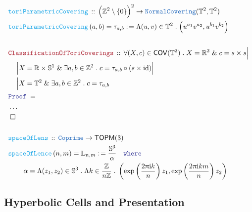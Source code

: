 \documentclass[12pt]{scrartcl}
\newcommand{\TYPE}[1]{\textcolor{NavyBlue}{\mathtt{#1}}}
\newcommand{\FUNC}[1]{\textcolor{Cerulean}{\mathtt{#1}}}
\newcommand{\LOGIC}[1]{\textcolor{Blue}{\mathtt{#1}}}
\newcommand{\THM}[1]{\textcolor{Maroon}{\mathtt{#1}}}
\renewcommand{\.}{\; . \;}
\newcommand{\de}{: \kern 0.1pc =}
\newcommand{\where}{\LOGIC{where}}
\newcommand{\Act}[1]{\left( #1 \right)}
\newcommand{\Theorem}[2]{& \THM{#1} \, :: \, #2 \\ & \Proof = \\ }
\newcommand{\DeclareFunc}[2]{& \FUNC{#1} \, :: \, #2 \\}
\newcommand{\DefineNamedFunc}[4]{&  \FUNC{#1}\Act{#2} = #3 \de #4 \\}
\newcommand{\NewLine}{\\ & \kern 1pc}
\newcommand{\Page}[1]{ \begin{align*} #1 \end{align*}   }
\newcommand{\NoProof}{ & \ldots \\ \EndProof}
\renewcommand{\And}{\; \& \;}
\newcommand{\Int}{\mathbb{Z} }
\newcommand{\Reals}{\mathbb{R} }
\newcommand{\Sphere}{\mathbb{S}}
\DeclareMathOperator*{\id}{id}
\newcommand{\QED}{\; \square}
\newcommand{\EndProof}{& \QED \\}
\newcommand{\Proof}{\LOGIC{Proof} \; }
\newcommand{\Torus}{\mathbb{T}}
\newcommand{\TOPM}{\mathsf{TOPM}}
\newcommand{\COV}{\mathsf{COV}}
\begin{document}
\Page{
	\DeclareFunc{toriParametricCovering}{\Big(\Int^2 \setminus \{0\}\Big)^2 \to\TYPE{NormalCovering}(\mathbb{T}^2,\mathbb{T}^2)}
	\DefineNamedFunc{toriParametricCovering}{a,b}
	{
		\tau_{a,b}}{\Lambda (u,v) \in \mathbb{T}^2 \. \Big(u^{a_1}v^{a_2},u^{b_1}v^{b_2}\Big) 
	}
	\\
	\Theorem{ClassificationOfToriCoverings}
	{
		\forall (X,c) \in \COV(\Torus^2) \.
		X = \Reals^2 \And c = s \times s \Big| \NewLine \Big|
		X = \Reals \times \Sphere^1 \And 
		\exists a,b \in \Int^2 \. c = \tau_{a,b} \circ (s \times \id) \Big| \NewLine \Big|
		X = \Torus^2 \And \exists a,b \in \Int^2 \. c = \tau_{a,b}
	}
	\NoProof
	\\
	\DeclareFunc{spaceOfLens}{\TYPE{Coprime} \to \TOPM(3)}
	\DefineNamedFunc{spaceOfLence}{n,m}{\mathbb{L}_{n,m}}
	{
		\frac{\Sphere^3}{\alpha} 
		\quad
		\where
		\NewLine
		\quad
		\alpha = \Lambda (z_1,z_2) \in \Sphere^3 \. 
		\Lambda k \in \frac{\Int}{n\Int} \.
		\left( \exp\left( \frac{2\uppi\mathrm{i}k}{n} \right) z_1, 
			\exp\left( \frac{2\uppi\mathrm{i}km}{n} \right) z_2
		\right)
	}
}
\newpage
\subsection{Hyperbolic Cells and Presentation}
\end{document}
